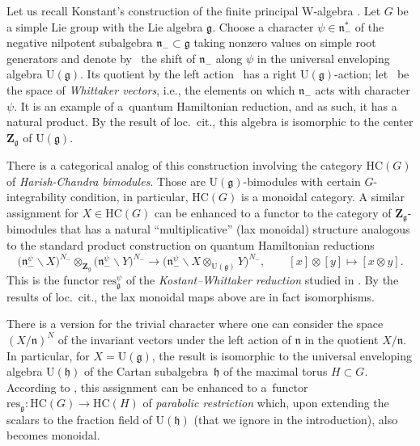 \documentclass[10pt,a4paper]{article}
\numberwithin{equation}{section}
\newcommand{\Z}{\mathbf{Z}}
\newcommand{\g}{\mathfrak{g}}
\newcommand{\h}{\mathfrak{h}}
\newcommand{\n}{\mathfrak{n}}
\newcommand{\res}{\mathrm{res}}
\begin{document}
	Let us recall Konstant's construction of the finite principal W-algebra \cite{Kostant}. Let $G$ be a simple Lie group with the Lie algebra $\g$. Choose a character $\psi \in \n_-^*$ of the negative nilpotent subalgebra $ \n_- \subset \g $ taking nonzero values on simple root generators and denote by~\smash{$\n_-^{\psi} = \{x - \psi(x) \mid x\in \n_-\}$} the shift of $\n_-$ along $\psi$ in the universal enveloping algebra $\mathrm{U}(\g)$. Its quotient by the left action~\smash{$\n_-^{\psi} \backslash \mathrm{U}(\g)$} has a right $\mathrm{U}(\g)$-action; let~\smash{$\bigl(\n_-^{\psi} \backslash \mathrm{U}(\g)\bigr)^{N_-}$} be the space of \emph{Whittaker vectors}, i.e., the elements on which $\n_-$ acts with character $\psi$. It is an example of a~quantum Hamiltonian reduction, and as such, it has a natural product. By the result of loc.\ cit., this algebra is isomorphic to the center $\Z_{\g}$ of $\mathrm{U}(\g)$.
	
	There is a categorical analog of this construction involving the category $\mathrm{HC}(G)$ of \emph{Harish-Chandra bimodules}. Those are $\mathrm{U}(\g)$-bimodules with certain $G$-integrability condition, in particular, $\mathrm{HC}(G)$ is a monoidal category. A similar assignment \smash{$X \mapsto \bigl(\n_-^{\psi} \backslash X\bigr)^{N_-}$} for $X\in \mathrm{HC}(G)$ can be enhanced to a functor to the category of $\Z_{\g}$-bimodules that has a natural ``multiplicative'' (lax monoidal) structure analogous to the standard product construction on quantum Hamiltonian reductions
	\[
	\bigl(\n_-^{\psi} \backslash X\bigr)^{N_-} \otimes_{\Z_{g}} \bigl(\n_-^{\psi} \backslash Y\bigr)^{N_-} \rightarrow \bigl(\n_-^{\psi} \backslash X \otimes_{\mathrm{U}(\g)} Y\bigr)^{N_-}, \qquad [x] \otimes [y] \mapsto [x\otimes y].
	\]
	This is the functor $\res_{\g}^{\psi}$ of the \emph{Kostant--Whittaker reduction} studied in \cite{BezrukavnikovFinkelberg}. By the results of loc.\ cit., the lax monoidal maps above are in fact isomorphisms.
	
	There is a version for the trivial character where one can consider the space $(X/\n)^{N}$ of the invariant vectors under the left action of $\n$ in the quotient $X/\n$. In particular, for $X = \mathrm{U}(\g)$, the result is isomorphic to the universal enveloping algebra $\mathrm{U}(\h)$ of the Cartan subalgebra~$\h$ of the maximal torus $H\subset G$. According to \cite{KalmykovSafronov}, this assignment can be enhanced to a~functor~${\res_{\g} \colon \mathrm{HC}(G) \rightarrow \mathrm{HC}(H)}$ of \emph{parabolic restriction} which, upon extending the scalars to the fraction field of $\mathrm{U}(\h)$ (that we ignore in the introduction), also becomes monoidal.
	
\end{document}
